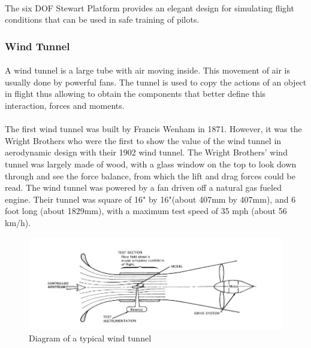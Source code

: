 \paragraph{}The six DOF Stewart Platform provides an elegant design for simulating flight conditions that can be used in safe training of pilots. 
\subsubsection{Wind Tunnel}
\paragraph{}
A wind tunnel is a large tube with air moving inside. This movement of air is usually done by powerful fans. The tunnel is used to copy the actions of an object in flight thus allowing
to obtain the components that better define this interaction, forces and moments.
\paragraph{} The first wind tunnel was built by
Francis Wenham in 1871. However, it was the Wright Brothers who were the first to show the value of the wind tunnel in aerodynamic design with their 1902 wind tunnel.  The Wright Brothers’ wind tunnel was largely made of wood, with a glass window on the top to look down through and see the force balance, from which the
lift and drag forces could be read. The wind tunnel was powered by a fan driven off a natural gas fueled engine. Their tunnel was square of 16" by 16"(about 407mm by 407mm), and 6 foot long (about 1829mm), with a maximum test speed of 35 mph (about 56 km/h).
	\begin{figure}[!h]
	\includegraphics{Figures/Fig2}
	\caption{Diagram of a typical wind tunnel}
	\end{figure}
